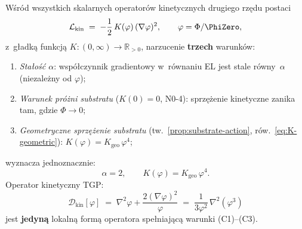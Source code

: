 
\begin{theorem}[Jednoznaczno\'s\'c operatora $\mathcal{D}_{\mathrm{kin}}$
  z~$\alpha = 2$]%
\label{thm:D-uniqueness}
W\'sr\'od wszystkich skalarnych operator\'ow kinetycznych
drugiego rz\k{e}du postaci
\begin{equation}\label{eq:Lkin-general}
  \mathcal{L}_{\mathrm{kin}} \;=\;
    -\frac{1}{2}\,K(\varphi)\,(\nabla\varphi)^2,
  \qquad
  \varphi = \Phi/\PhiZero,
\end{equation}
z~g\l{}adk\k{a} funkcj\k{a} $K : (0,\infty) \to \mathbb{R}_{>0}$,
narzucenie \textbf{trzech} warunk\'ow:
\begin{enumerate}[(C1)]
  \item \emph{Sta\l{}o\'s\'c $\alpha$}: wsp\'o\l{}czynnik gradientowy
    w~r\'ownaniu EL jest stale r\'owny~$\alpha$ (niezale\.zny od $\varphi$);
  \item \emph{Warunek pr\'o\.zni substratu} ($K(0) = 0$, N0-4):
    sprz\k{e}\.zenie kinetyczne zanika tam, gdzie $\Phi \to 0$;
  \item \emph{Geometryczne sprz\k{e}\.zenie substratu}
    (tw.~\ref{prop:substrate-action}, r\'ow.~\eqref{eq:K-geometric}):
    $K(\varphi) = K_{\mathrm{geo}}\,\varphi^4$;
\end{enumerate}
wyznacza jednoznacznie:
\begin{equation}\label{eq:alpha-unique}
  \boxed{
    \alpha = 2,
    \qquad
    K(\varphi) = K_{\mathrm{geo}}\,\varphi^4.
  }
\end{equation}
Operator kinetyczny TGP:
\begin{equation}\label{eq:Dkin-unique}
  \mathcal{D}_{\mathrm{kin}}[\varphi]
  \;=\; \nabla^2\varphi + \frac{2(\nabla\varphi)^2}{\varphi}
  \;=\; \frac{1}{3\varphi^2}\,\nabla^2(\varphi^3)
\end{equation}
jest \textbf{jedyn\k{a}} lokaln\k{a} form\k{a} operatora spe\l{}niaj\k{a}c\k{a}
warunki (C1)--(C3).
\end{theorem}

